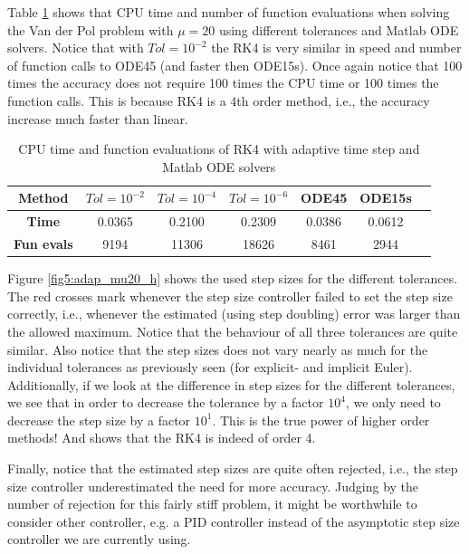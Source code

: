 Table \ref{tab5:mu20_adap} shows that CPU time and number of function evaluations when solving the Van der Pol problem with $\mu = 20$ using different tolerances and Matlab ODE solvers. Notice that with $Tol = 10^{-2}$ the RK4 is very similar in speed and number of function calls to ODE45 (and faster then ODE15s). Once again notice that 100 times the accuracy does not require 100 times the CPU time or 100 times the function calls. This is because RK4 is a 4th order method, i.e., the accuracy increase much faster than linear. 

\begin{table}[H]
    \centering
    \caption{CPU time and function evaluations of RK4 with adaptive time step and Matlab ODE solvers}
    \begin{tabular}{|c||c|c|c|c|c|c|} \hline
         \textbf{Method}    & $Tol = 10^{-2}$&   $Tol = 10^{-4}$ & $Tol = 10^{-6}$ & ODE45 & ODE15s     \\ \hline \hline 
         \textbf{Time}      & 0.0365  &  0.2100  &  0.2309 & 0.0386 & 0.0612   \\ \hline
         \textbf{Fun evals} &  9194    &   11306   &    18626 & 8461 & 2944  \\ \hline
    \end{tabular}
    \label{tab5:mu20_adap}
\end{table}

Figure \ref{fig5:adap_mu20_h} shows the used step sizes for the different tolerances. The red crosses mark whenever the step size controller failed to set the step size correctly, i.e., whenever the estimated (using step doubling) error was larger than the allowed maximum. Notice that the behaviour of all three tolerances are quite similar. Also notice that the step sizes does not vary nearly as much for the individual tolerances as previously seen (for explicit- and implicit Euler). Additionally, if we look at the difference in step sizes for the different tolerances, we see that in order to decrease the tolerance by a factor $10^4$, we only need to decrease the step size by a factor $10^1$. This is the true power of higher order methods! And shows that the RK4 is indeed of order 4. 

Finally, notice that the estimated step sizes are quite often rejected, i.e., the step size controller underestimated the need for more accuracy. Judging by the number of rejection for this fairly stiff problem, it might be worthwhile to consider other controller, e.g. a PID controller instead of the asymptotic step size controller we are currently using. 

